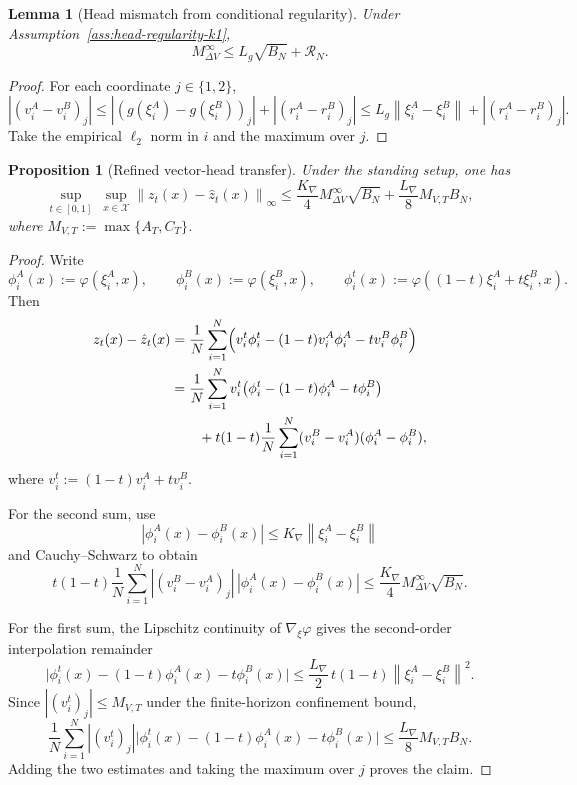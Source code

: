 \documentclass[11pt]{article}
\newtheorem{proposition}[theorem]{Proposition}
\newtheorem{lemma}[theorem]{Lemma}
\theoremstyle{definition}
\newcommand{\norm}[1]{\left\lVert #1 \right\rVert}
\newcommand{\mc}[1]{\mathcal{#1}}
\begin{document}
\begin{lemma}[Head mismatch from conditional regularity]
\label{lem:head-mismatch-regular-k1}
Under Assumption~\ref{ass:head-regularity-k1},
\begin{equation}
  M_{\Delta V}^\infty
  \le
  L_g\sqrt{B_N}+\mc{R}_N.
  \label{eq:head-mismatch-regular-k1}
\end{equation}
\end{lemma}

\begin{proof}
For each coordinate $j\in\{1,2\}$,
\[
  |(v_i^A-v_i^B)_j|
  \le
  |(g(\xi_i^A)-g(\xi_i^B))_j|
  +
  |(r_i^A-r_i^B)_j|
  \le
  L_g\norm{\xi_i^A-\xi_i^B}+|(r_i^A-r_i^B)_j|.
\]
Take the empirical $\ell_2$ norm in $i$ and the maximum over $j$.
\end{proof}

\begin{proposition}[Refined vector-head transfer]
\label{prop:refined-transfer-k1}
Under the standing setup, one has
\begin{equation}
  \sup_{t\in[0,1]}\ \sup_{x\in\mc{X}}
  \norm{z_t(x)-\hat z_t(x)}_\infty
  \le
  \frac{K_{\nabla}}{4}M_{\Delta V}^\infty\sqrt{B_N}
  +
  \frac{L_{\nabla}}{8}M_{V,T}B_N,
  \label{eq:refined-transfer-k1}
\end{equation}
where $M_{V,T}:=\max\{A_T,C_T\}$.
\end{proposition}

\begin{proof}
Write
\[
  \phi_i^A(x):=\varphi(\xi_i^A,x),
  \qquad
  \phi_i^B(x):=\varphi(\xi_i^B,x),
  \qquad
  \phi_i^t(x):=\varphi((1-t)\xi_i^A+t\xi_i^B,x).
\]
Then
\begin{align*}
  z_t(x)-\hat z_t(x)
  &=
  \frac1N\sum_{i=1}^N
  \Bigl(
    v_i^t\phi_i^t-(1-t)v_i^A\phi_i^A-tv_i^B\phi_i^B
  \Bigr)
  \\
  &=
  \frac1N\sum_{i=1}^N
  v_i^t\bigl(\phi_i^t-(1-t)\phi_i^A-t\phi_i^B\bigr)
  \\
  &\qquad
  +
  t(1-t)\frac1N\sum_{i=1}^N
  (v_i^B-v_i^A)(\phi_i^A-\phi_i^B),
\end{align*}
where $v_i^t:=(1-t)v_i^A+tv_i^B$.

For the second sum, use
\[
  |\phi_i^A(x)-\phi_i^B(x)|
  \le
  K_{\nabla}\norm{\xi_i^A-\xi_i^B}
\]
and Cauchy--Schwarz to obtain
\[
  t(1-t)\frac1N\sum_{i=1}^N
  |(v_i^B-v_i^A)_j|\,|\phi_i^A(x)-\phi_i^B(x)|
  \le
  \frac{K_{\nabla}}{4}M_{\Delta V}^\infty\sqrt{B_N}.
\]

For the first sum, the Lipschitz continuity of $\nabla_\xi\varphi$ gives the
second-order interpolation remainder
\[
  \bigl|
    \phi_i^t(x)-(1-t)\phi_i^A(x)-t\phi_i^B(x)
  \bigr|
  \le
  \frac{L_{\nabla}}{2}\,t(1-t)\norm{\xi_i^A-\xi_i^B}^2.
\]
Since $|(v_i^t)_j|\le M_{V,T}$ under the finite-horizon confinement bound,
\[
  \frac1N\sum_{i=1}^N
  |(v_i^t)_j|
  \bigl|
    \phi_i^t(x)-(1-t)\phi_i^A(x)-t\phi_i^B(x)
  \bigr|
  \le
  \frac{L_{\nabla}}{8}M_{V,T}B_N.
\]
Adding the two estimates and taking the maximum over $j$ proves the claim.
\end{proof}
\end{document}

